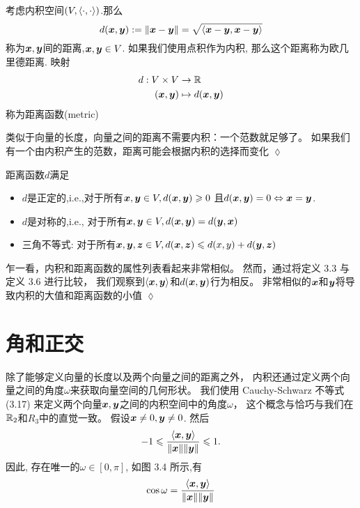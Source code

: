\begin{definition}[距离和距离函数]
    考虑内积空间$(V,\left\langle\cdot,\cdot\right\rangle)$.那么
    \begin{equation}
        d(\boldsymbol{x},\boldsymbol{y}) := \|\boldsymbol{x}-\boldsymbol{y}\| = \sqrt{\left\langle\boldsymbol{x}-\boldsymbol{y},\boldsymbol{x}-\boldsymbol{y}\right\rangle}
    \end{equation}
    称为$\boldsymbol{x},\boldsymbol{y}$间的距离,$\boldsymbol{x},\boldsymbol{y} \in V$.
    如果我们使用点积作为内积, 那么这个距离称为欧几里德距离.
    映射
    \begin{align}
        d:V \times V &\rightarrow \mathbb{R} \\
        (\boldsymbol{x},\boldsymbol{y}) &\mapsto d(\boldsymbol{x},\boldsymbol{y})
    \end{align}
    称为距离函数(metric)
\end{definition}

\begin{remark}
    类似于向量的长度，向量之间的距离不需要内积：一个范数就足够了。
    如果我们有一个由内积产生的范数，距离可能会根据内积的选择而变化
    \hfill $\lozenge$
\end{remark}

距离函数$d$满足
\begin{itemize}
    \item $d$是正定的,i.e.,对于所有$\boldsymbol{x},\boldsymbol{y} \in V, d(\boldsymbol{x},\boldsymbol{y}) \geqslant 0$
          且$d(\boldsymbol{x},\boldsymbol{y}) = 0 \Leftrightarrow \boldsymbol{x} = \boldsymbol{y}$.
    \item $d$是对称的,i.e., 对于所有$\boldsymbol{x},\boldsymbol{y} \in V, d(\boldsymbol{x},\boldsymbol{y}) = d(\boldsymbol{y},\boldsymbol{x})$
    \item 三角不等式: 对于所有$\boldsymbol{x},\boldsymbol{y},\boldsymbol{z} \in V, d(\boldsymbol{x},\boldsymbol{z}) \leqslant d(x,y) + d(\boldsymbol{y},\boldsymbol{z})$
\end{itemize}

\begin{remark}
    乍一看，内积和距离函数的属性列表看起来非常相似。
    然而，通过将定义 3.3 与定义 3.6 进行比较，
    我们观察到$\left\langle\boldsymbol{x},\boldsymbol{y}\right\rangle$和$d(\boldsymbol{x}, \boldsymbol{y})$行为相反。
    非常相似的$\boldsymbol{x}$和$\boldsymbol{y}$将导致内积的大值和距离函数的小值
    \hfill $\lozenge$
\end{remark}

\section{角和正交}
除了能够定义向量的长度以及两个向量之间的距离之外，
内积还通过定义两个向量之间的角度$\omega$来获取向量空间的几何形状。
我们使用 Cauchy-Schwarz 不等式 (3.17)
来定义两个向量$\boldsymbol{x}, \boldsymbol{y}$之间的内积空间中的角度$\omega$，
这个概念与恰巧与我们在$\mathbb{R}_2$和$R_3$中的直觉一致。
假设$\boldsymbol{x} \neq 0, \boldsymbol{y} \neq 0$. 然后
\begin{equation}
    -1 \leqslant
    \frac{\left\langle\boldsymbol{x},\boldsymbol{y}\right\rangle}{\|\boldsymbol{x}\|\|\boldsymbol{y}\|}
    \leqslant 1.
\end{equation}
因此, 存在唯一的$\omega \in [0,\pi]$, 如图 3.4 所示,有
\begin{equation}
    \cos \omega = \frac{\left\langle\boldsymbol{x},\boldsymbol{y}\right\rangle}{\|\boldsymbol{x}\|\|\boldsymbol{y}\|}
\end{equation}

